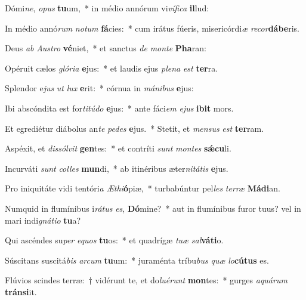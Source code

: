 \item Dómi\textit{ne}, \textit{o}\textit{pus} \textbf{tu}um,~* in médio annórum vi\textit{ví}\textit{fi}\textit{ca} \textbf{il}lud:
\item In médio annó\textit{rum} \textit{no}\textit{tum} \textbf{fá}cies:~* cum irátus fúeris, misericórdi\textit{æ} \textit{re}\textit{cor}\textbf{dá}\textbf{be}ris.
\item Deus \textit{ab} \textit{Aus}\textit{tro} \textbf{vé}niet,~* et sanctus \textit{de} \textit{mon}\textit{te} \textbf{Pha}ran:
\item Opéruit cælos \textit{gló}\textit{ri}\textit{a} \textbf{e}jus:~* et laudis ejus \textit{ple}\textit{na} \textit{est} \textbf{ter}ra.
\item Splendor e\textit{jus} \textit{ut} \textit{lux} \textbf{e}rit:~* córnua in \textit{má}\textit{ni}\textit{bus} \textbf{e}jus:
\item Ibi abscóndita est for\textit{ti}\textit{tú}\textit{do} \textbf{e}jus:~* ante fáci\textit{em} \textit{e}\textit{jus} \textbf{i}\textbf{bit} mors.
\item Et egrediétur diábolus an\textit{te} \textit{pe}\textit{des} \textbf{e}jus.~* Stetit, et \textit{men}\textit{sus} \textit{est} \textbf{ter}ram.
\item Aspéxit, et \textit{dis}\textit{sól}\textit{vit} \textbf{gen}tes:~* et contríti \textit{sunt} \textit{mon}\textit{tes} \textbf{sǽ}\textbf{cu}li.
\item Incurváti \textit{sunt} \textit{col}\textit{les} \textbf{mun}di,~* ab itinéribus æter\textit{ni}\textit{tá}\textit{tis} \textbf{e}jus.
\item Pro iniquitáte vidi tentóri\textit{a} \textit{Æ}\textit{thi}\textbf{ó}piæ,~* turbabúntur pel\textit{les} \textit{ter}\textit{ræ} \textbf{Má}\textbf{di}an.
\item Numquid in flumínibus i\textit{rá}\textit{tus} \textit{es}, \textbf{Dó}mine?~* aut in flumínibus furor tuus? vel in mari indi\textit{gná}\textit{ti}\textit{o} \textbf{tu}a?
\item Qui ascéndes su\textit{per} \textit{e}\textit{quos} \textbf{tu}os:~* et quadrígæ \textit{tu}\textit{æ} \textit{sal}\textbf{vá}\textbf{ti}o.
\item Súscitans suscitá\textit{bis} \textit{ar}\textit{cum} \textbf{tu}um:~* juraménta tríbu\textit{bus} \textit{quæ} \textit{lo}\textbf{cú}\textbf{tus} es.
\item Flúvios scindes terræ:~† vidérunt te, et do\textit{lu}\textit{é}\textit{runt} \textbf{mon}tes:~* gurges \textit{a}\textit{quá}\textit{rum} \textbf{tráns}\textbf{i}it.
